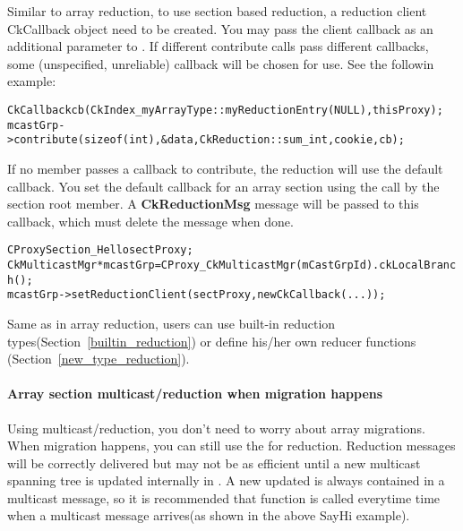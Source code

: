 Similar to array reduction, to use section based reduction, a reduction
client CkCallback object need to be created. You may pass the client callback 
as an additional parameter to . If different contribute calls 
pass different callbacks, some (unspecified, unreliable) callback will be 
chosen for use. See the followin example:

\begin{alltt}
    CkCallback cb(CkIndex_myArrayType::myReductionEntry(NULL),thisProxy); 
    mcastGrp->contribute(sizeof(int), &data, CkReduction::sum_int, cookie, cb);
\end{alltt}

If no member passes a callback to contribute, the reduction will use the 
default callback. You set the default callback for an array section using the 
 call by the section root member. A 
{\bf CkReductionMsg} message will be passed to this callback, which 
must delete the message when done.

\begin{alltt}
  CProxySection_Hello sectProxy;
  CkMulticastMgr *mcastGrp = CProxy_CkMulticastMgr(mCastGrpId).ckLocalBranch();
  mcastGrp->setReductionClient(sectProxy, new CkCallback(...));
\end{alltt}

Same as in array reduction, users can use built-in reduction 
types(Section~\ref{builtin_reduction}) or define his/her own reducer functions
(Section~\ref{new_type_reduction}).

\paragraph{Array section multicast/reduction when migration happens}
Using multicast/reduction, you don't need to worry about array migrations.
When migration happens, you can still use the  for
reduction. Reduction messages will be correctly delivered but 
may not be as efficient until a new multicast spanning tree is updated
internally in . A new updated  is always
contained in a multicast message, so it is recommended that 
 function is called everytime time when a multicast 
message arrives(as shown in the above SayHi example).



